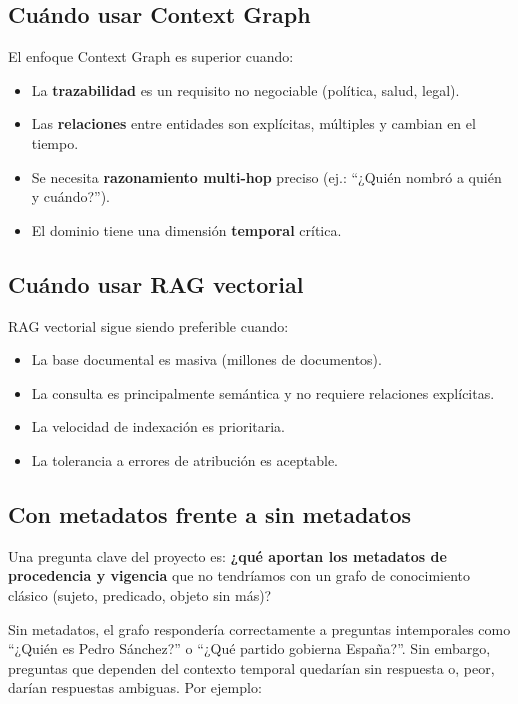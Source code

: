 \documentclass[12pt,a4paper]{article}
\begin{document}
\subsection{Cuándo usar Context Graph}

El enfoque Context Graph es superior cuando:

\begin{itemize}
  \item La \textbf{trazabilidad} es un requisito no negociable (política, salud, legal).
  \item Las \textbf{relaciones} entre entidades son explícitas, múltiples y cambian en el tiempo.
  \item Se necesita \textbf{razonamiento multi-hop} preciso (ej.: ``¿Quién nombró a quién y cuándo?'').
  \item El dominio tiene una dimensión \textbf{temporal} crítica.
\end{itemize}

\subsection{Cuándo usar RAG vectorial}

RAG vectorial sigue siendo preferible cuando:

\begin{itemize}
  \item La base documental es masiva (millones de documentos).
  \item La consulta es principalmente semántica y no requiere relaciones explícitas.
  \item La velocidad de indexación es prioritaria.
  \item La tolerancia a errores de atribución es aceptable.
\end{itemize}

\subsection{Con metadatos frente a sin metadatos}

Una pregunta clave del proyecto es: \textbf{¿qué aportan los metadatos de procedencia y vigencia} que no tendríamos con un grafo de conocimiento clásico (sujeto, predicado, objeto sin más)?

Sin metadatos, el grafo respondería correctamente a preguntas intemporales como ``¿Quién es Pedro Sánchez?'' o ``¿Qué partido gobierna España?''. Sin embargo, preguntas que dependen del contexto temporal quedarían sin respuesta o, peor, darían respuestas ambiguas. Por ejemplo:
\end{document}
